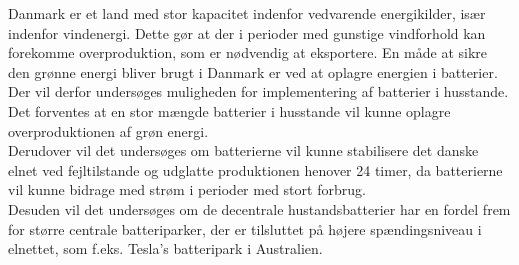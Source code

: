
\label{Problemformulering}

Danmark er et land med stor kapacitet indenfor vedvarende energikilder, især indenfor vindenergi. Dette gør at der i perioder med gunstige vindforhold kan forekomme overproduktion, som er nødvendig at eksportere. En måde at sikre den grønne energi bliver brugt i Danmark er ved at oplagre energien i batterier. \\
Der vil derfor undersøges muligheden for implementering af batterier i husstande. Det forventes at en stor mængde batterier i husstande vil kunne oplagre overproduktionen af grøn energi. \\


Derudover vil det undersøges om batterierne vil kunne stabilisere det danske elnet ved fejltilstande og udglatte produktionen henover 24 timer, da batterierne vil kunne bidrage med strøm i perioder med stort forbrug. \\
Desuden vil det undersøges om de decentrale hustandsbatterier har en fordel frem for større centrale batteriparker, der er tilsluttet på højere spændingsniveau i elnettet, som f.eks. Tesla’s batteripark i Australien.
